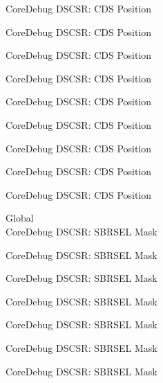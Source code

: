 \begin{DoxyRefList}
\label{deprecated__deprecated000646}%
%
Core\+Debug DSCSR\+: CDS Position 

\label{deprecated__deprecated000771}%
%
Core\+Debug DSCSR\+: CDS Position 

\label{deprecated__deprecated000825}%
%
Core\+Debug DSCSR\+: CDS Position 

\label{deprecated__deprecated000901}%
%
Core\+Debug DSCSR\+: CDS Position 

\label{deprecated__deprecated000964}%
%
Core\+Debug DSCSR\+: CDS Position 

\label{deprecated__deprecated001043}%
%
Core\+Debug DSCSR\+: CDS Position 

\label{deprecated__deprecated001119}%
%
Core\+Debug DSCSR\+: CDS Position 

\label{deprecated__deprecated001222}%
%
Core\+Debug DSCSR\+: CDS Position 

\label{deprecated__deprecated001324}%
%
Core\+Debug DSCSR\+: CDS Position  
\item[Global \doxylink{group___c_m_s_i_s___s_c_b_gaaffe28a24f05446e55ba3d75bb6f4cd0}{Core\+Debug\+\_\+\+DSCSR\+\_\+\+SBRSEL\+\_\+\+Msk} ]\hfill \\
\label{deprecated__deprecated000096}%
%
Core\+Debug DSCSR\+: SBRSEL Mask 

\label{deprecated__deprecated000150}%
%
Core\+Debug DSCSR\+: SBRSEL Mask 

\label{deprecated__deprecated000226}%
%
Core\+Debug DSCSR\+: SBRSEL Mask 

\label{deprecated__deprecated000289}%
%
Core\+Debug DSCSR\+: SBRSEL Mask 

\label{deprecated__deprecated000368}%
%
Core\+Debug DSCSR\+: SBRSEL Mask 

\label{deprecated__deprecated000444}%
%
Core\+Debug DSCSR\+: SBRSEL Mask 

\label{deprecated__deprecated000547}%
%
Core\+Debug DSCSR\+: SBRSEL Mask 


\end{DoxyRefList}
